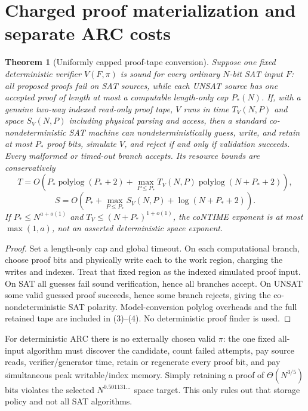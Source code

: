 \documentclass[11pt]{article}
\newtheorem{theorem}{Theorem}
\begin{document}
\section{Charged proof materialization and separate ARC costs}
\begin{theorem}[Uniformly capped proof-tape conversion]\label{th:conversion}
Suppose one fixed deterministic verifier $V(F,\pi)$ is sound for \emph{every} ordinary $N$-bit SAT input $F$: all proposed proofs fail on SAT sources, while each UNSAT source has one accepted proof of length at most a computable length-only cap $P_*(N)$. If, with a genuine two-way indexed read-only proof tape, $V$ runs in time $T_V(N,P)$ and space $S_V(N,P)$ including physical parsing and access, then a standard co-nondeterministic SAT machine can nondeterministically \emph{guess, write, and retain} at most $P_*$ proof bits, simulate $V$, and reject if and only if validation succeeds. Every malformed or timed-out branch accepts. Its resource bounds are conservatively
\[
 T=O\left(P_*\operatorname{polylog}(P_*+2)+\max_{P\le P_*}T_V(N,P)
       \operatorname{polylog}(N+P_*+2)\right),\tag{3}
\]
\[
 S=O\left(P_*+\max_{P\le P_*}S_V(N,P)+\log(N+P_*+2)\right).\tag{4}
\]
If $P_*\le N^{a+o(1)}$ and $T_V\le(N+P_*)^{1+o(1)}$, the coNTIME exponent is at most $\max(1,a)$, \emph{not} an asserted deterministic space exponent.
\end{theorem}
\begin{proof}
Set a length-only cap and global timeout. On each computational branch, choose proof bits and physically write each to the work region, charging the writes and indexes. Treat that fixed region as the indexed simulated proof input. On SAT all guesses fail sound verification, hence all branches accept. On UNSAT some valid guessed proof succeeds, hence some branch rejects, giving the co-nondeterministic SAT polarity. Model-conversion polylog overheads and the full retained tape are included in (3)--(4). No deterministic proof finder is used.
\end{proof}

For deterministic ARC there is no externally chosen valid $\pi$: the one fixed all-input algorithm must discover the candidate, count failed attempts, pay source reads, verifier/generator time, retain or regenerate every proof bit, and pay simultaneous peak writable/index memory. Simply retaining a proof of $\Theta(N^{3/5})$ bits violates the selected $N^{0.501131\ldots}$ space target. This only rules out that storage policy and not all SAT algorithms.
\end{document}
